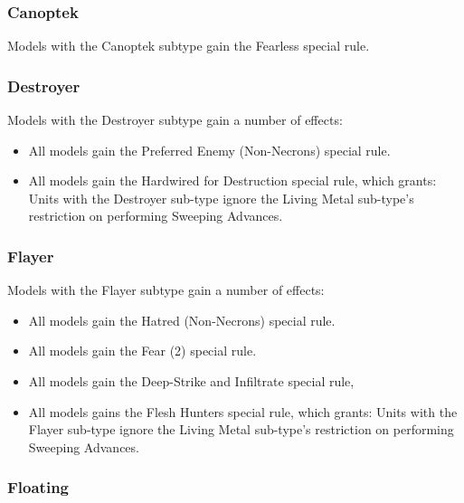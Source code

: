 \subsubsection{Canoptek} \label{Canoptek}

Models with the Canoptek subtype gain the Fearless special rule. \\

\subsubsection{Destroyer} \label{Destroyer}

Models with the Destroyer subtype gain a number of effects:

\begin{itemize}
	\item All models gain the Preferred Enemy (Non-Necrons) special rule. \\
	\item All models gain the Hardwired for Destruction special rule, which grants: Units with the Destroyer sub-type ignore the Living Metal sub-type's restriction on performing Sweeping Advances. \\
\end{itemize}

\subsubsection{Flayer} \label{Flayer}

Models with the Flayer subtype gain a number of effects:

\begin{itemize}
	\item All models gain the Hatred (Non-Necrons) special rule. \\
	\item All models gain the Fear (2) special rule. \\
	\item All models gain the Deep-Strike and Infiltrate special rule, \\
	\item All models gains the Flesh Hunters special rule, which grants: Units with the Flayer sub-type ignore the Living Metal sub-type's restriction on performing Sweeping Advances. \\
\end{itemize}

\subsubsection{Floating} \label{Floating}

